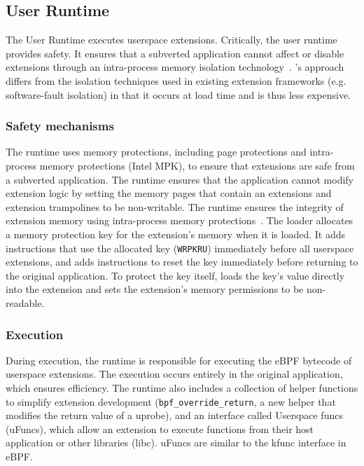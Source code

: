 \subsection{\sys User Runtime}\label{sec:design:UVM}
The \sys User Runtime executes userspace extensions.  Critically, the \sys{} user runtime provides safety. It ensures that a subverted application cannot affect or disable extensions through an intra-process memory isolation technology~\cite{Vahldiek19, xie2022cetis}.  \sys's approach differs from the isolation techniques used in existing extension frameworks (e.g. software-fault isolation) in that it occurs at load time and is thus less expensive.


\subsubsection{Safety mechanisms}

The \sys{} runtime uses memory protections, including page protections and intra-process memory protections (\eg Intel MPK), to ensure that extensions are safe from a subverted application.  The runtime ensures that the application cannot modify extension logic by setting the memory pages that contain an extensions and extension trampolines to be non-writable.  The runtime ensures the integrity of extension memory using intra-process memory protections~\cite{Vahldiek19, xie2022cetis}.  The \sys{} loader allocates a memory protection key for the extension's memory when it is loaded.  It adds instructions that use the allocated key (\ie \texttt{WRPKRU}) immediately before all userspace extensions, and adds instructions to reset the key immediately before returning to the original application.  To protect the key itself, \sys{} loads the key's value directly into the extension and sets the extension's memory permissions to be non-readable.

\subsubsection{Execution}

During execution, the \sys runtime is responsible for executing the eBPF bytecode of userspace extensions.  The execution occurs entirely in the original application, which ensures efficiency.   The runtime also includes a collection of helper functions to simplify extension development (\eg  \texttt{bpf\_override\_return}, a new helper that modifies the return value of a uprobe), and an interface called Userspace funcs (uFuncs), which allow an extension to execute functions from their host application or other libraries (\eg libc).  uFuncs are similar to the kfunc interface in eBPF.

